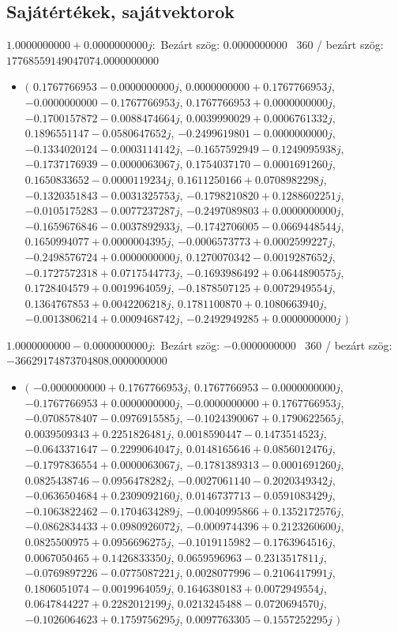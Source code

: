 \documentclass[14pt,a4paper]{article}
\begin{document}
\subsection{Sajátértékek, sajátvektorok}
$1.0000000000+0.0000000000j$:\
Bezárt szög: $0.0000000000$ \
360 / bezárt szög: $17768559149047074.0000000000$\
\begin{itemize}
\item
$\big($
$0.1767766953-0.0000000000j$, $0.0000000000+0.1767766953j$, $-0.0000000000-0.1767766953j$, $0.1767766953+0.0000000000j$, $-0.1700157872-0.0088474664j$, $0.0039990029+0.0006761332j$, $0.1896551147-0.0580647652j$, $-0.2499619801-0.0000000000j$, $-0.1334020124-0.0003114142j$, $-0.1657592949-0.1249095938j$, $-0.1737176939-0.0000063067j$, $0.1754037170-0.0001691260j$, $0.1650833652-0.0000119234j$, $0.1611250166+0.0708982298j$, $-0.1320351843-0.0031325753j$, $-0.1798210820+0.1288602251j$, $-0.0105175283-0.0077237287j$, $-0.2497089803+0.0000000000j$, $-0.1659676846-0.0037892933j$, $-0.1742706005-0.0669448544j$, $0.1650994077+0.0000004395j$, $-0.0006573773+0.0002599227j$, $-0.2498576724+0.0000000000j$, $0.1270070342-0.0019287652j$, $-0.1727572318+0.0717544773j$, $-0.1693986492+0.0644890575j$, $0.1728404579+0.0019964059j$, $-0.1878507125+0.0072949554j$, $0.1364767853+0.0042206218j$, $0.1781100870+0.1080663940j$, $-0.0013806214+0.0009468742j$, $-0.2492949285+0.0000000000j$
$\big)$
\end{itemize}
$1.0000000000-0.0000000000j$:\
Bezárt szög: $-0.0000000000$ \
360 / bezárt szög: $-36629174873704808.0000000000$\
\begin{itemize}
\item
$\big($
$-0.0000000000+0.1767766953j$, $0.1767766953-0.0000000000j$, $-0.1767766953+0.0000000000j$, $-0.0000000000+0.1767766953j$, $-0.0708578407-0.0976915585j$, $-0.1024390067+0.1790622565j$, $0.0039509343+0.2251826481j$, $0.0018590447-0.1473514523j$, $-0.0643371647-0.2299064047j$, $0.0148165646+0.0856012476j$, $-0.1797836554+0.0000063067j$, $-0.1781389313-0.0001691260j$, $0.0825438746-0.0956478282j$, $-0.0027061140-0.2020349342j$, $-0.0636504684+0.2309092160j$, $0.0146737713-0.0591083429j$, $-0.1063822462-0.1704634289j$, $-0.0040995866+0.1352172576j$, $-0.0862834433+0.0980926072j$, $-0.0009744396+0.2123260600j$, $0.0825500975+0.0956696275j$, $-0.1019115982-0.1763964516j$, $0.0067050465+0.1426833350j$, $0.0659596963-0.2313517811j$, $-0.0769897226-0.0775087221j$, $0.0028077996-0.2106417991j$, $0.1806051074-0.0019964059j$, $0.1646380183+0.0072949554j$, $0.0647844227+0.2282012199j$, $0.0213245488-0.0720694570j$, $-0.1026064623+0.1759756295j$, $0.0097763305-0.1557252295j$
$\big)$
\end{itemize}
\end{document}
